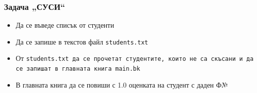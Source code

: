 \documentclass{beamer}
\begin{document}
\begin{frame}
  \frametitle{Задача „СУСИ“}

  \begin{itemize}
  \item Да се въведе списък от студенти
  \item Да се запише в текстов файл \tt{students.txt}
  \item От \tt{students.txt} да се прочетат студентите, които не са скъсани и да се запишат в главната книга \tt{main.bk}
  \item В главната книга да се повиши с 1.0 оценката на студент с даден Ф№
  \end{itemize}
\end{frame}
\end{document}
